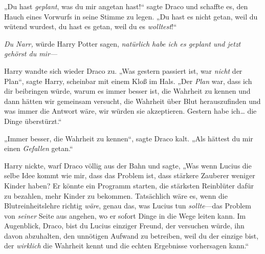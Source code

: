 „Du hast \emph{geplant}, was du mir angetan hast!“ sagte Draco und schaffte es, den Hauch eines Vorwurfs in seine Stimme zu legen. „Du hast es nicht getan, weil du wütend wurdest, du hast es getan, weil du es \emph{wolltest}!“

\emph{Du Narr,} würde Harry Potter sagen, \emph{natürlich habe ich es geplant und jetzt gehörst du mir—}

Harry wandte sich wieder Draco zu. „Was gestern passiert ist, war \emph{nicht} der Plan“, sagte Harry, scheinbar mit einem Kloß im Hals. „Der \emph{Plan} war, dass ich dir beibringen würde, warum es immer besser ist, die Wahrheit zu kennen und dann hätten wir gemeinsam versucht, die Wahrheit über Blut herauszufinden und was immer die Antwort wäre, wir würden sie akzeptieren. Gestern habe ich… die Dinge überstürzt.“

„Immer besser, die Wahrheit zu kennen“, sagte Draco kalt. „Als hättest du mir einen \emph{Gefallen} getan.“

Harry nickte, warf Draco völlig aus der Bahn und sagte, „Was wenn Lucius die selbe Idee kommt wie mir, dass das Problem ist, dass stärkere Zauberer weniger Kinder haben? Er könnte ein Programm starten, die stärksten Reinblüter dafür zu bezahlen, mehr Kinder zu bekommen. Tatsächlich wäre es, wenn die Blutreinheitslehre richtig \emph{wäre}, genau das, was Lucius tun \emph{sollte}—das Problem von \emph{seiner} Seite aus angehen, wo er sofort Dinge in die Wege leiten kann. Im Augenblick, Draco, bist du Lucius einziger Freund, der versuchen würde, ihn davon abzuhalten, den unnötigen Aufwand zu betreiben, weil du der einzige bist, der \emph{wirklich} die Wahrheit kennt und die echten Ergebnisse vorhersagen kann.“

